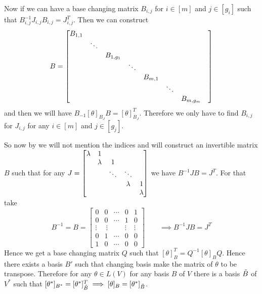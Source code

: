 \documentclass[a4paper, 11pt]{article}
\begin{document}
{Now if we can have a base changing matrix $B_{i, j}$ for $i\in[m]$ and $j\in[g_i]$ such that $B_{i,j}^{-1}J_{i,j}B_{i,j}=J_{i,j}^T$. Then we can construct $$B=\left[\begin{matrix}\begin{matrix}B_{1,1} & & \\ & \ddots & \\ & & B_{1,g_1}\end{matrix} & &  \\
& \ddots&  &  \\
& &  \begin{matrix}B_{m,1} & & \\ & \ddots & \\ & & B_{m,g_{m}}\end{matrix} \end{matrix}\right]$$ and then we will have $B_{-1}[\theta]_{B_J}B=[\theta]_{B_J}^T$.  Therefore we only have to find $B_{i,j}$ for $J_{i,j}$ for any $i\in[m]$ and $j\in[g_j]$. 

So now by we will not mention the indices and will construct an invertible matrix $B$ such that for any $J=\left[\begin{matrix}\lambda & 1   &        & & \\
& \lambda & 1      & &\\
&     & \ddots & \ddots &\\
&      &        &        \lambda& 1\\
&       &        &         & \lambda\end{matrix}\right]$ we have $B^{-1}JB=J^T$. For that take $$B^{-1} = B = \begin{bmatrix} 0 & 0 & \cdots & 0 & 1 \\ 0 & 0 & \cdots & 1 & 0 \\ \vdots & \ \vdots & & \vdots & \vdots \\ 0 & 1 & \cdots & 0 & 0 \\ 1 & 0 & \cdots & 0 & 0 \end{bmatrix} \qquad\implies B^{-1}JB=J^T$$Hence we get a base changing matrix $Q$ such that $[\theta]_{B}^T=Q^{-1}[\theta]_BQ$. Hence there exists a basis $B'$ such that changing basis make the matrix of $\theta$ to be transpose. Therefore  for any $\theta\in L(V)$ for any basis $B$ of $V$ there is a basis $\tilde{B}$ of $V^*$ such that $[\theta^*]_{B^*}=[\theta^*]^T_{\tilde{B}}\implies [\theta]_B=[\theta^*]_{\tilde{B}}$.
}

\end{document}
